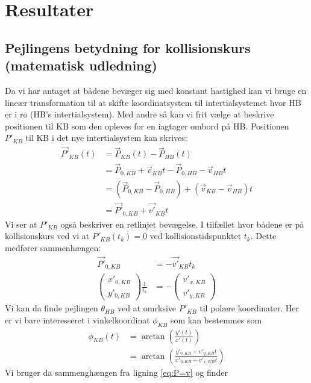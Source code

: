 \documentclass[%
 reprint,
nofootinbib,
aps,
]{revtex4-1}
\begin{document}
\section{Resultater}

\subsection{Pejlingens betydning for kollisionskurs (matematisk udledning)}\label{sec:pejling_betydning}
Da vi har antaget at bådene bevæger sig med konstant hastighed kan vi bruge en lineær transformation til at skifte koordinatsystem til intertialsystemet hvor HB er i ro (HB's intertialsystem). Med andre så kan vi frit vælge at beskrive positionen til KB som den opleves for en iagtager ombord på HB. Positionen $P'_{KB}$ til KB i det nye intertialsystem kan skrives:
\begin{align*}
  \vec{P'}_{KB}(t) &= \vec{P}_{KB}(t) - \vec{P}_{HB}(t) \\
  &= \vec{P}_{0,KB} + \vec{v}_{KB}t - \vec{P}_{0,HB} - \vec{v}_{HB}t \\
  &= (\vec{P}_{0,KB} - \vec{P}_{0,HB}) + (\vec{v}_{KB} - \vec{v}_{HB})t \\
  &= \vec{P'}_{0,KB} + \vec{v'}_{KB}t
\end{align*}
Vi ser at $P'_{KB}$ også beskriver en retlinjet bevægelse. I tilfællet hvor bådene er på kollisionskurs ved vi at $P'_{KB}(t_k) = 0$ ved kollisionstidspunktet $t_{k}$. Dette medfører sammenhængen:
\begin{align}
  \vec{P'}_{0,KB} &= - \vec{v'}_{KB}t_k \nonumber \\
  \begin{pmatrix} x'_{0,KB} \\ y'_{0,KB} \end{pmatrix}\frac{1}{t_k} &=   -\begin{pmatrix} v'_{x,KB} \\ v'_{y,KB} \end{pmatrix}
  \label{eq:P=v}
\end{align}
Vi kan da finde pejlingen $\theta_{HB}$ ved at omrksive $P'_{KB}$ til polære koordinater. Her er vi bare interesseret i vinkelkoordinat $\phi_{KB}$ som kan bestemmes som
\begin{align*}
  \phi_{KB}(t) &= \arctan{\left( \frac{y'(t)}{x'(t)}\right)} \\
  &= \arctan{\left( \frac{y'_{0,KB} + v'_{y,KB}t}{x'_{0,KB} + v'_{x,KB}t}\right)}
\end{align*}
Vi bruger da sammenghængen fra ligning \ref{eq:P=v} og finder
\end{document}
